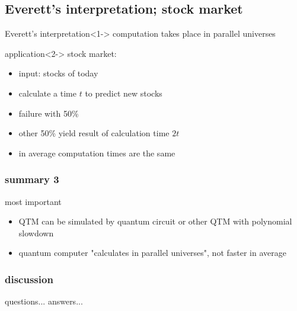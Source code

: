 \documentclass{beamer}
\begin{document}
\subsection{Everett's interpretation; stock market}
\begin{frame}
	\begin{block}{Everett's interpretation}<1->
		computation takes place in parallel universes
	\end{block}
	\begin{block}{application}<2->
		stock market:
		\begin{itemize}
			\item input: stocks of today
			\item calculate a time $t$ to predict new stocks
			\item failure with 50\%
			\item other 50\% yield result of calculation time $2t$
			\item in average computation times are the same
		\end{itemize}
	\end{block}
\end{frame}
%
\begin{frame}
	\frametitle{summary 3}
	\begin{block}{most important}
		\begin{itemize}
			\item<1-> QTM can be simulated by quantum circuit or other QTM with polynomial slowdown
			\item<2-> quantum computer "calculates in parallel universes", not faster in average
		\end{itemize}
	\end{block}
\end{frame}
%
\begin{frame}
	\tableofcontents
\end{frame}
%
\begin{frame}
	\frametitle{discussion}
	\begin{block}{questions...}
		answers...
	\end{block}
\end{frame}
%
\end{document}
